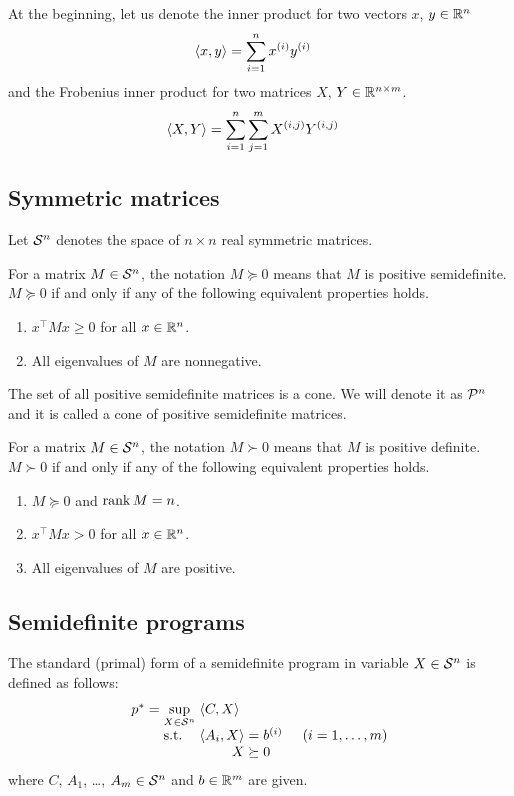 At the beginning, let us denote the inner product for two vectors $x$, $y \in\mathbb{R}^n$
\begin{align}
  \langle x, y\rangle &= \sum_{i=1}^n x^{(i)}y^{(i)}
\end{align}
and the Frobenius inner product for two matrices $X$, $Y\in\mathbb{R}^{n\times m}$.
\begin{align}
  \langle X, Y\rangle &= \sum_{i=1}^n \sum_{j=1}^m X^{(i,j)}Y^{(i,j)}
\end{align}

\subsection{Symmetric matrices}
Let $\mathcal{S}^n$ denotes the space of $n\times n$ real symmetric matrices.

For a matrix $M\in\mathcal{S}^n$, the notation $M \succeq 0$ means that $M$ is positive semidefinite.
$M \succeq 0$ if and only if any of the following equivalent properties holds.
\begin{enumerate}
  \item $x^\top Mx \geq 0$ for all $x \in \mathbb{R}^n$.
  \item All eigenvalues of $M$ are nonnegative.
\end{enumerate}
The set of all positive semidefinite matrices is a cone.
We will denote it as $\mathcal{P}^n$ and it is called a cone of positive semidefinite matrices.

For a matrix $M\in\mathcal{S}^n$, the notation $M \succ 0$ means that $M$ is positive definite.
$M \succ 0$ if and only if any of the following equivalent properties holds.
\begin{enumerate}
  \item $M \succeq 0$ and $\operatorname{rank} M = n$.
  \item $x^\top Mx > 0$ for all $x \in \mathbb{R}^n$.
  \item All eigenvalues of $M$ are positive.
\end{enumerate}

\subsection{Semidefinite programs}
The standard (primal) form of a semidefinite program in variable $X\in\mathcal{S}^n$ is defined as follows:
\begin{align}
  \arraycolsep=1.4pt
  \begin{array}{rclrcl@{\hskip0.5cm}l}
    p^* &=& \displaystyle \sup_{X\in\Sym^n} & \multicolumn{3}{l}{\langle C,X\rangle} \\
    && \text{s.t.} & \langle A_i, X\rangle &=& b\ind i & (i = 1,\ldots,m)\\
    &&& X &\succeq& 0
  \end{array}
\end{align}
where $C$, $A_1$, \ldots, $A_m \in \mathcal{S}^n$ and $b\in\mathbb{R}^m$ are given.

